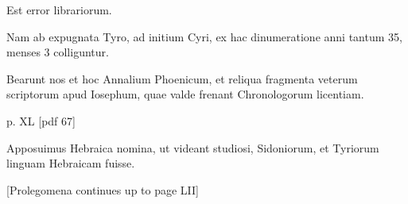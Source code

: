 \begin{parnumbers}
Est error librariorum.

Nam ab expugnata
Tyro, ad initium Cyri, ex hac dinumeratione anni tantum
35, menses 3 colliguntur.

Bearunt nos et hoc Annalium Phoenicum,
et reliqua fragmenta veterum scriptorum apud Iosephum, quae valde
frenant Chronologorum licentiam.

\clearpage
p. XL [pdf 67]

Apposuimus Hebraica
nomina, ut videant studiosi, Sidoniorum, et Tyriorum linguam
Hebraicam fuisse.



[Prolegomena continues up to page LII]

\end{parnumbers}
